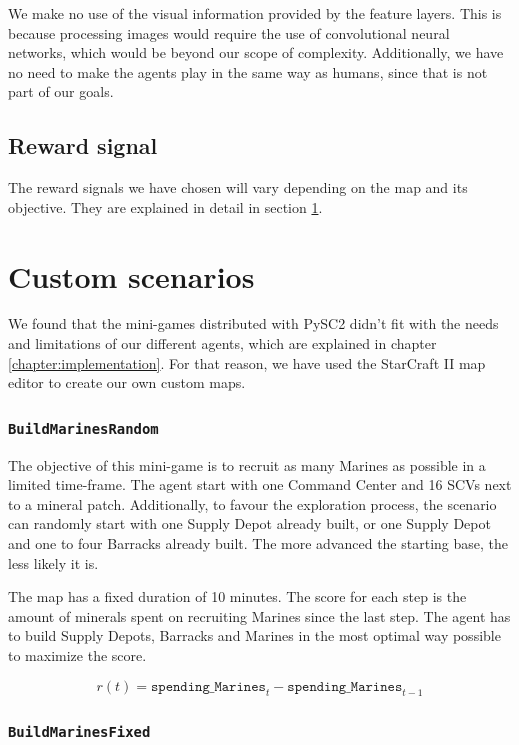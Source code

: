 We make no use of the visual information provided by the feature layers. This is because processing images would require the use of convolutional neural networks, which would be beyond our scope of complexity. Additionally, we have no need to make the agents play in the same way as humans, since that is not part of our goals.

\subsection{Reward signal}

The reward signals we have chosen will vary depending on the map and its objective. They are explained in detail in section \ref{sec:mini-games}.

\section{Custom scenarios}
\label{sec:mini-games}

We found that the mini-games distributed with PySC2 didn't fit with the needs and limitations of our different agents, which are explained in chapter \ref{chapter:implementation}. For that reason, we have used the StarCraft II map editor to create our own custom maps.

\subsubsection*{\texttt{BuildMarinesRandom}}

The objective of this mini-game is to recruit as many Marines as possible in a limited time-frame. The agent start with one Command Center and 16 SCVs next to a mineral patch. Additionally, to favour the exploration process, the scenario can randomly start with one Supply Depot already built, or one Supply Depot and one to four Barracks already built. The more advanced the starting base, the less likely it is.

The map has a fixed duration of 10 minutes. The score for each step is the amount of minerals spent on recruiting Marines since the last step. The agent has to build Supply Depots, Barracks and Marines in the most optimal way possible to maximize the score.

$$
r(t) = \texttt{spending\_Marines}_{t} - \texttt{spending\_Marines}_{t-1}
$$

\subsubsection*{\texttt{BuildMarinesFixed}}


